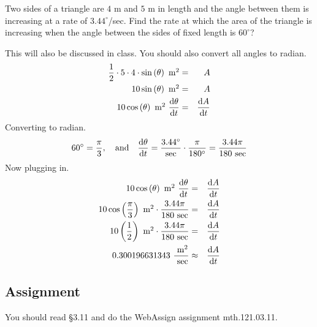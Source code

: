 \documentclass[12pt,addpoints, answers, fleqn]{exam}
\begin{document}
\begin{questions}
\question Two sides of a triangle are $4$ m and $5$ m in length and the angle between them is increasing at a rate of $3.44^\circ$/sec. Find the rate at which the area of the triangle is increasing when the angle between the sides of fixed length is $60^\circ$?
\begin{solution}
This will also be discussed in class. You should also convert all angles to radian.
\begin{eqnarray*}
\frac{1}{2} \cdot 5 \cdot 4 \cdot \sin \left( \theta \right) \mbox{ m$^2$} &=& A\\
10 \sin \left(  \theta \right) \mbox{ m$^2$} &=& A\\
10 \cos \left( \theta \right) \mbox{ m$^2$} \ \frac{{\rm{d}} \theta}{{\rm{d}}t} &=&  \frac{{\rm{d}}A}{{\rm{d}}t}\\
\end{eqnarray*}
Converting to radian.
\[
60^\circ = \frac{\pi}{3}, \quad \mbox{and} \quad \frac{{\rm{d}} \theta}{{\rm{d}}t} = \frac{3.44^\circ}{\mbox{sec}} \cdot \frac{\pi}{180^\circ} = \frac{3.44\pi}{180 \mbox{ sec}}
\]
Now plugging in.
\begin{eqnarray*}
10 \cos \left(  \theta \right) \mbox{ m$^2$} \ \frac{{\rm{d}} \theta}{{\rm{d}}t} &=&  \frac{{\rm{d}}A}{{\rm{d}}t}\\
10 \cos \left( \frac{\pi}{3} \right) \mbox{ m$^2$} \cdot \frac{3.44\pi}{180 \mbox{ sec}} &=&  \frac{{\rm{d}}A}{{\rm{d}}t}\\
10 \left( \frac{1}{2} \right) \mbox{ m$^2$} \cdot \frac{3.44\pi}{180 \mbox{ sec}} &=&  \frac{{\rm{d}}A}{{\rm{d}}t}\\
0.300196631343 \ \frac{\mbox{ m$^2$}}{\mbox{ sec}} &\approx&  \frac{{\rm{d}}A}{{\rm{d}}t}\\
\end{eqnarray*}
\end{solution}


\end{questions}
\subsection{Assignment}
You should read \S  3.11 and do the WebAssign assignment mth.121.03.11.
\vfill
\pagebreak
\end{document}

